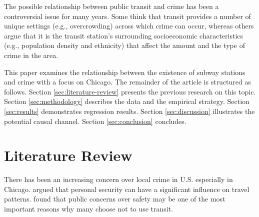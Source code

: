 \documentclass[a4paper, 11pt]{article}
\begin{document}

The possible relationship between public transit and crime has been a controversial issue for many years. Some think that transit provides a number of unique settings (e.g., overcrowding) across which crime can occur, whereas others argue that it is the transit station's surrounding socioeconomic characteristics (e.g., population density and ethnicity) that affect the amount and the type of crime in the area.


This paper examines the relationship between the existence of subway stations and crime with a focus on Chicago. The remainder of the article is structured as follows. Section \ref{sec:literature-review} presents the previous research on this topic. Section \ref{sec:methodology} describes the data and the empirical strategy. Section \ref{sec:results} demonstrates regression results. Section \ref{sec:discussion} illustrates the potential causal channel. Section \ref{sec:conclusion} concludes.

\section{Literature Review \label{sec:literature-review}}

There has been an increasing concern over local crime in U.S. especially in Chicago. \cite{fear} argued that personal security can have a significant influence on travel patterns. \cite{pattern} found that public concerns over safety may be one of the most important reasons why many choose not to use transit.
 
 
\end{document}
